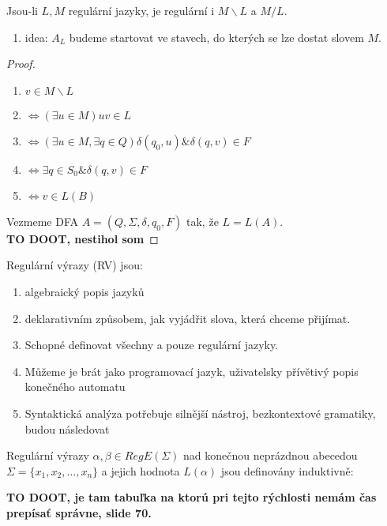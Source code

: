 \documentclass[../main.tex]{subfiles}
\begin{document}
\begin{theorem}
    Jsou-li $L,M$ regulární jazyky, je regulární i $M\backslash L$ a $M/L$.
    \begin{enumerate}
        \item idea: $A_L$ budeme startovat ve stavech, do kterých se lze dostat slovem $M$.
    \end{enumerate}
\end{theorem}
\begin{proof}
    \begin{enumerate}
        \item $v \in M \backslash L$
        \item $\Leftrightarrow (\exists u \in M) uv \in L$
        \item $\Leftrightarrow (\exists u \in M, \exists q \in Q) \delta(q_0,u) \& \delta(q,v) \in F$
        \item $\Leftrightarrow \exists q \in S_0 \& \delta(q,v) \in F$
        \item $\Leftrightarrow v \in L(B)$
    \end{enumerate}
    Vezmeme DFA $A = (Q,\Sigma,\delta,q_0,F)$ tak, že $L = L(A)$.\\
    \textbf{TO DOOT, nestihol som}
\end{proof}


\begin{definition}
    Regulární výrazy (RV) jsou:
    \begin{enumerate}
        \item algebraický popis jazyků
        \item deklarativním způsobem, jak vyjádřit slova, která chceme přijímat.
        \item Schopné definovat všechny a pouze regulární jazyky.
        \item Můžeme je brát jako programovací jazyk, uživatelsky přívětivý popis konečného automatu
        \item Syntaktická analýza potřebuje silnější nástroj, bezkontextové gramatiky, budou následovat
    \end{enumerate}

    Regulární výrazy $\alpha, \beta \in RegE(\Sigma)$ nad konečnou neprázdnou abecedou 
    $\Sigma = \{x_1,x_2,\dots ,x_n\}$ a jejich hodnota $L(\alpha)$ jsou definovány induktivně:
    
    \textbf{TO DOOT, je tam tabuľka na ktorú pri tejto rýchlosti nemám čas prepísať správne, slide 70.}
\end{definition}
\end{document}
